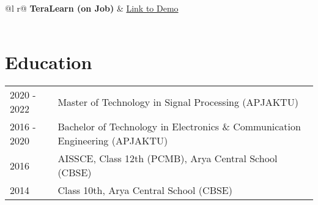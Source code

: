 \documentclass[a4paper,12pt]{article}
\begin{document}
\begin{tabularx}{\linewidth}{ @{}l r@{} }
\textbf{TeraLearn (on Job)} & \hfill \href{https://github.com/hiteshah185/starfish}{Link to Demo} \\[3.75pt]
  \\
\end{tabularx}
\section{Education}
\begin{tabularx}{\linewidth}{@{}l X@{}}	
2020 - 2022 & Master of Technology in Signal Processing \hfill (APJAKTU) \\ 
2016 - 2020 & Bachelor of Technology in Electronics \& Communication Engineering \hfill (APJAKTU) \\ 

2016 & AISSCE, Class 12th (PCMB), Arya Central School \hfill  (CBSE) \\

2014 & Class 10th, Arya Central School \hfill  (CBSE) \\
\end{tabularx}


\end{document}
